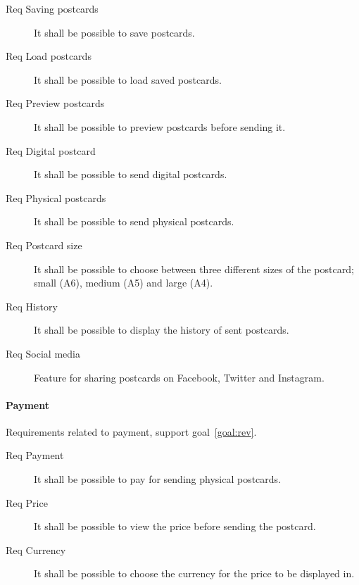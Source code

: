 \documentclass[10pt,a4paper]{article}
\begin{document}
\begin{description}
	\item [Req  Saving postcards] It shall be possible to save postcards.
	\item [Req  Load postcards] It shall be possible to load saved postcards.
	
	\item [Req  Preview postcards] It shall be possible to preview postcards before sending it.
	
	\item [Req  Digital postcard] It shall be possible to send digital postcards.
	\item [Req  Physical postcards] It shall be possible to send physical postcards.
	
	\item [Req  Postcard size] It shall be possible to choose between three different sizes of the postcard; small (A6), medium (A5) and large (A4).
	\item [Req  History] It shall be possible to display the history of sent postcards.
	\item [Req  Social media] Feature for sharing postcards on Facebook, Twitter and Instagram.
\end{description}

\paragraph{Payment}
Requirements related to payment, support goal~\ref{goal:rev}.
\begin{description}
\item [Req  Payment] It shall be possible to pay for sending physical postcards.
\item [Req  Price] It shall be possible to view the price before sending the postcard.
\item [Req  Currency] It shall be possible to choose the currency for the price to be displayed in.
\end{description}
\end{document}
